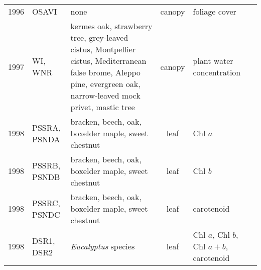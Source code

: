 \documentclass[10pt]{article}
\begin{document}
{\begin{ThreePartTable}
\begin{longtable}{c M{1.5in} M{2.5in} c M{1.5in} M{1.5in}}
  1996 & OSAVI                                           & none                                                                                                                                                                                                                                                  & canopy       & foliage cover                                                                            & \citet{Rondeaux1996}                                \\
  1997 & WI, WNR                                         & kermes oak, strawberry tree, grey-leaved cistus, Montpellier cistus, Mediterranean false brome, Aleppo pine, evergreen oak, narrow-leaved mock privet, mastic tree                                                                                    & canopy       & plant water concentration                                                                & \citet{Penuelas1997}                                \\
  1998 & PSSRA, PSNDA                                    & bracken, beech, oak, boxelder maple, sweet chestnut                                                                                                                                                                                                   & leaf         & Chl $a$                                                                                  & \citet{Blackburn1998a,Blackburn1998b}               \\
  1998 & PSSRB, PSNDB                                    & bracken, beech, oak, boxelder maple, sweet chestnut                                                                                                                                                                                                   & leaf         & Chl $b$                                                                                  & \citet{Blackburn1998a,Blackburn1998b}               \\
  1998 & PSSRC, PSNDC                                    & bracken, beech, oak, boxelder maple, sweet chestnut                                                                                                                                                                                                   & leaf         & carotenoid                                                                               & \citet{Blackburn1998a,Blackburn1998b}               \\
  1998 & DSR1, DSR2                                      & \textit{Eucalyptus} species                                                                                                                                                                                                                           & leaf         & Chl $a$, Chl $b$, Chl $a+b$, carotenoid                                                  & \citet{Datt1998}                                    \\

\end{longtable}
\end{ThreePartTable}}
\end{document}
